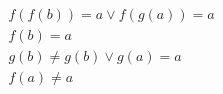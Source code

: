 \begin{align*}
%
& f(f(b)) = a \lor f(g(a)) = a
~\\~
& f(b) = a
~\\~
& g(b)  \neq  g(b) \lor g(a) = a
~\\~
& f(a)  \neq  a
%
\end{align*}
